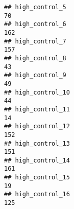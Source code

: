 \documentclass[
]{article}
\begin{document}
\begin{verbatim}
## high_control_5                                                                                                                                                                                                              70
## high_control_6                                                                                                                                                                                                             162
## high_control_7                                                                                                                                                                                                             157
## high_control_8                                                                                                                                                                                                              43
## high_control_9                                                                                                                                                                                                              49
## high_control_10                                                                                                                                                                                                             44
## high_control_11                                                                                                                                                                                                             14
## high_control_12                                                                                                                                                                                                            152
## high_control_13                                                                                                                                                                                                            151
## high_control_14                                                                                                                                                                                                            161
## high_control_15                                                                                                                                                                                                             19
## high_control_16                                                                                                                                                                                                            125

\end{verbatim}
\end{document}
